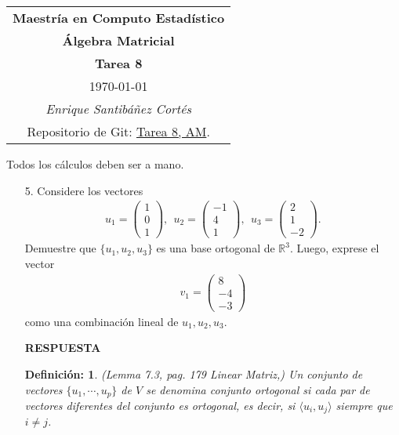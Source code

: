 \documentclass[11pt,letterpaper]{article}
\newcommand{\mR}{\mathbb{R}}
\newcommand{\res}{\textbf{RESPUESTA}\\}
\newtheorem{thmd}{Definición:}
\begin{document}


\begin{table}[ht]
\centering
\begin{tabular}{c}
\textbf{Maestría en Computo Estadístico}\\
\textbf{Álgebra Matricial} \\
\textbf{Tarea 8}\\
\today \\
\emph{Enrique Santibáñez Cortés}\\
Repositorio de Git: \href{https://github.com/Enriquesec/Algebra_matricial/tree/master/tareas/Tarea_8}{Tarea 8, AM}.
\end{tabular}
\end{table}
Todos los cálculos deben ser a mano.

\begin{itemize}
\item[5.] Considere los vectores 
\begin{align*}
u_1=\begin{pmatrix} 1\\ 0 \\ 1 \end{pmatrix}, \ \ 
u_2=\begin{pmatrix} -1\\ 4 \\ 1 \end{pmatrix}, \ \ 
u_3=\begin{pmatrix} 2\\ 1 \\ -2 \end{pmatrix}.
\end{align*}
Demuestre que $\{u_1, u_2,u_3\}$ es una base ortogonal de $\mR^3$. Luego, exprese el vector 
\begin{align*}
v_1= \begin{pmatrix}
8\\
-4\\
-3
\end{pmatrix}
\end{align*}
como una combinación lineal de $u_1, u_2,u_3$. 

\res \begin{framed}
    \begin{thmd} \label{d_ortogonal}
	(Lemma 7.3, pag. 179 Linear Matriz,) Un conjunto de vectores $\{u_1 ,\cdots, u_p \}$ de $V$ se denomina conjunto ortogonal si cada par de vectores diferentes del conjunto es ortogonal, es decir, si $\langle u_i, u_j \rangle$ siempre
que $i \neq j$.
    \end{thmd}
\end{framed}


\end{itemize}
\end{document}
